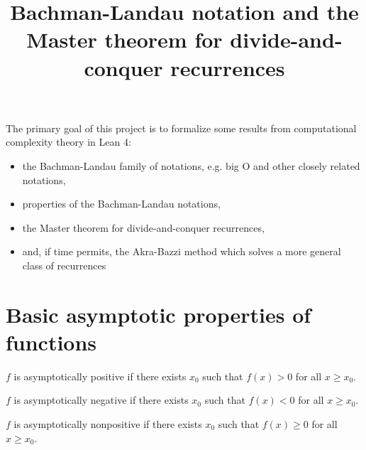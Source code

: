 
\title{Bachman-Landau notation and the Master theorem for divide-and-conquer recurrences}

The primary goal of this project is to formalize some results from computational 
complexity theory in Lean 4:
\begin{itemize}
\item the Bachman-Landau family of notations, e.g. big O and other closely related notations,
\item properties of the Bachman-Landau notations,
\item the Master theorem for divide-and-conquer recurrences,
\item and, if time permits, the Akra-Bazzi method which solves a more general class of recurrences
\end{itemize}


\section{Basic asymptotic properties of functions}

\begin{definition}
    \label{def:asymp_pos}
    \leanok
    $f$ is asymptotically positive if there exists $x_0$ such that $f(x) > 0$
    for all $x \ge x_0$.

\end{definition}

\begin{definition}
    \label{def:asymp_neg}
    \leanok
    $f$ is asymptotically negative if there exists $x_0$ such that $f(x) < 0$
    for all $x \ge x_0$.

\end{definition}

\begin{definition}
    \label{def:asymp_nonpos}
    \leanok
    $f$ is asymptotically nonpositive if there exists $x_0$ such that $f(x) \ge 0$
    for all $x \ge x_0$.

\end{definition}


